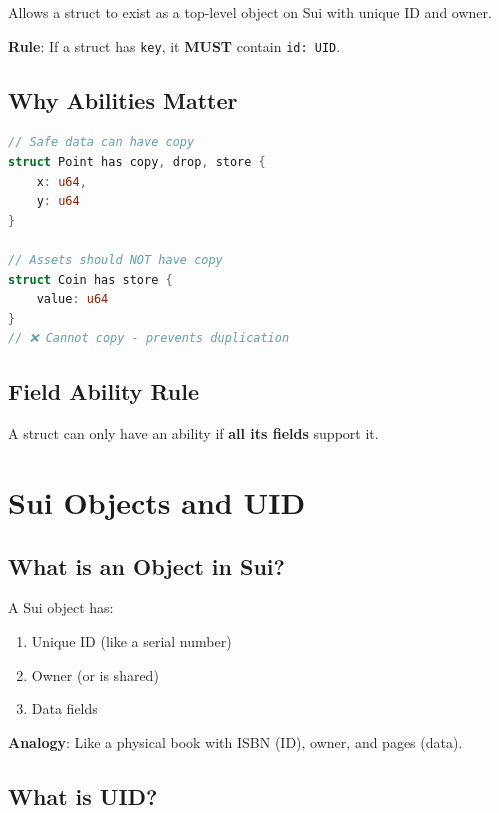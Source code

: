 \documentclass[11pt]{article}
\begin{document}
Allows a struct to exist as a top-level object on Sui with unique ID and owner.

\begin{noteBox}
\textbf{Rule}: If a struct has \texttt{key}, it \textbf{MUST} contain \texttt{id: UID}.
\end{noteBox}

\subsection{Why Abilities Matter}

\begin{lstlisting}[language=Rust]
// Safe data can have copy
struct Point has copy, drop, store {
    x: u64,
    y: u64
}

// Assets should NOT have copy
struct Coin has store {
    value: u64
}
// ❌ Cannot copy - prevents duplication
\end{lstlisting}

\subsection{Field Ability Rule}

A struct can only have an ability if \textbf{all its fields} support it.

\section{Sui Objects and UID}

\subsection{What is an Object in Sui?}

A Sui object has:
\begin{enumerate}
  \item Unique ID (like a serial number)
  \item Owner (or is shared)
  \item Data fields
\end{enumerate}

\begin{noteBox}
\textbf{Analogy}: Like a physical book with ISBN (ID), owner, and pages (data).
\end{noteBox}

\subsection{What is UID?}
\end{document}
